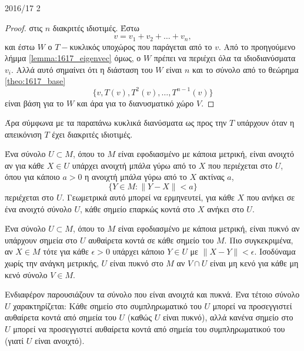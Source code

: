 \documentclass[a4paper,11pt]{article}
\begin{document}
\begin{solution}{2016/17 2}
\begin{proof}
        στις \( n \) διακριτές ιδιοτιμές. Έστω
        \begin{equation*}
            v = v_1 + v_2 + \dots + v_n,
        \end{equation*}
        και έστω \( W \) ο \(T-\)κυκλικός υποχώρος που παράγεται από το \( v \).
        Από το προηγούμενο λήμμα \ref{lemma:1617_eigenvec} όμως, ο \( W \) πρέπει να περιέχει όλα τα
        ιδιοδιανύσματα \( v_i \). Αλλά αυτό σημαίνει ότι η διάσταση του \( W \)
        είναι \( n \) και το σύνολο από το θεώρημα \ref{theo:1617_base}
        \begin{equation}\label{eq:1617_cyclic_base}
            \{ v, T(v), T^2(v), \dots, T^{n-1}(v) \}
        \end{equation}
        είναι βάση για το \( W \) και άρα για το διανυσματικό χώρο \( V \).
    \end{proof}
    Άρα σύμφωνα με τα παραπάνω κυκλικά διανύσματα ως προς την \( T \) υπάρχουν
    όταν η απεικόνιση \(T\) έχει διακριτές ιδιοτιμές.

    Ένα σύνολο \( U \subset M \), όπου το \( M \) είναι εφοδιασμένο με κάποια
    μετρική, είναι ανοιχτό αν για κάθε \( X \in U \) υπάρχει ανοιχτή μπάλα γύρω
    από το \( X \) που περιέχεται στο \( U \), όπου για κάποιο \( a > 0 \) η
    ανοιχτή μπάλα γύρω από το \( X \) ακτίνας \( a \),
    \begin{equation*}
        \{ Y \in M: \| Y - X \| < a \}
    \end{equation*}
    περιέχεται στο \( U \). Γεωμετρικά αυτό μπορεί να ερμηνευτεί, για κάθε
    \( X \) που ανήκει σε ένα ανοιχτό σύνολο \( U \), κάθε σημείο επαρκώς κοντά
    στο \( X \) ανήκει στο \( U \).

    Ένα σύνολο \( U \subset M \), όπου το \( M \) είναι εφοδιασμένο με κάποια
    μετρική, είναι πυκνό αν υπάρχουν σημεία στο \( U \) αυθαίρετα κοντά σε κάθε
    σημείο του \( M \). Πιο συγκεκριμένα, αν \( X \in M \) τότε για κάθε \(
    \epsilon > 0 \) υπάρχει κάποιο \( Y \in U \) με \( \| X - Y \| < \epsilon
    \). Ισοδύναμα χωρίς την ανάγκη μετρικής, \( U \) είναι πυκνό στο \( M \) αν
    \( V \cap U \) είναι μη κενό για κάθε μη κενό σύνολο \( V \in M \).

    Ενδιαφέρον παρουσιάζουν τα σύνολο που είναι ανοιχτά και πυκνά. Ένα τέτοιο σύνολο
    \( U \) χαρακτηρίζεται: Κάθε σημείο στο συμπληρωματικό του \( U \) μπορεί να
    προσεγγιστεί αυθαίρετα κοντά από σημεία του \( U \) (καθώς \( U \) είναι
    πυκνό), αλλά κανένα σημείο στο \( U \) μπορεί να προσεγγιστεί αυθαίρετα
    κοντά από σημεία του συμπληρωματικού του (γιατί \( U \) είναι ανοιχτό).


\end{solution}
\end{document}
